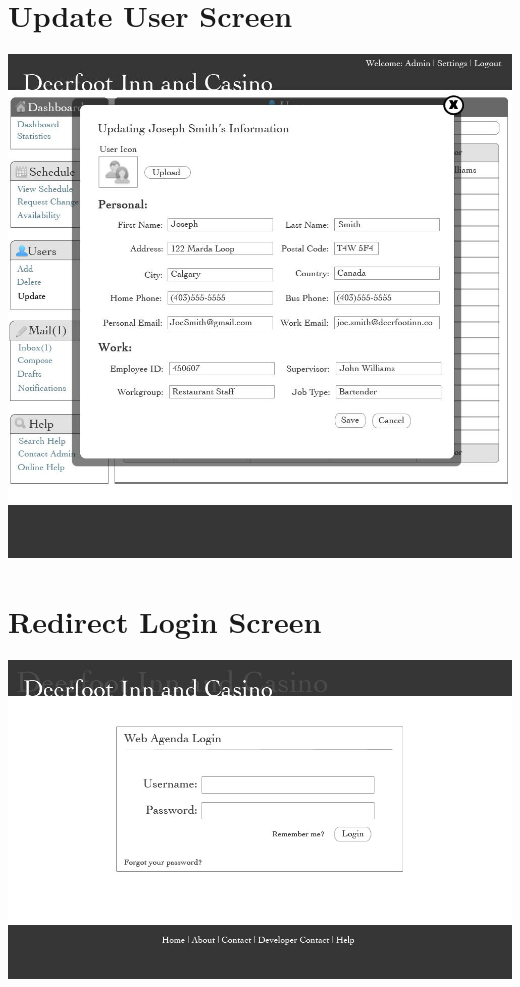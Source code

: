 \documentclass[letterpaper,12pt]{report}
\begin{document}
\begin{landscape}
\section{Update User Screen}
\begin{center}
 \includegraphics[scale=0.3]{prototypes/p2updateUserScreen.jpeg}
\end{center}

\section{Redirect Login Screen}
\begin{center}
 \includegraphics[scale=0.3]{prototypes/p2redirectLogin.jpg}
\end{center}


\end{landscape}
\end{document}
